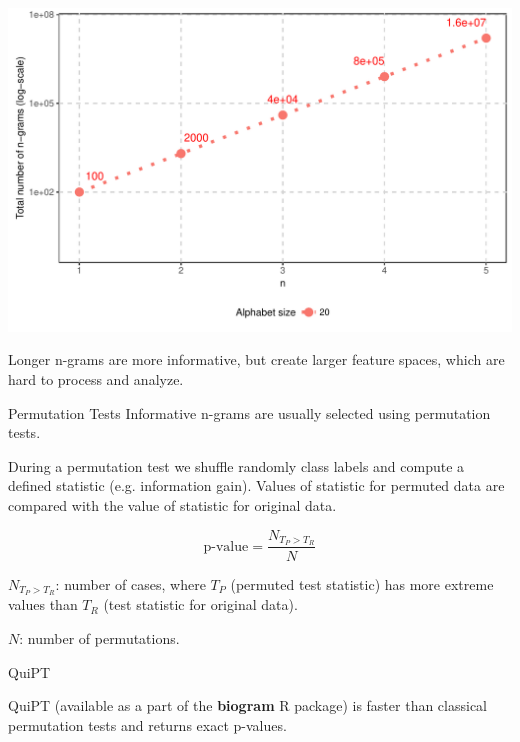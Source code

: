 \documentclass{beamer}\usepackage[]{graphicx}\usepackage[]{color}
\makeatletter
\def\maxwidth{ %
  \ifdim\Gin@nat@width>\linewidth
    \linewidth
  \else
    \Gin@nat@width
  \fi
}
\newenvironment{kframe}{%
 \def\at@end@of@kframe{}%
 \ifinner\ifhmode%
  \def\at@end@of@kframe{\end{minipage}}%
  \begin{minipage}{\columnwidth}%
 \fi\fi%
 \def\FrameCommand##1{\hskip\@totalleftmargin \hskip-\fboxsep
 \colorbox{shadecolor}{##1}\hskip-\fboxsep
     \hskip-\linewidth \hskip-\@totalleftmargin \hskip\columnwidth}%
 \MakeFramed {\advance\hsize-\width
   \@totalleftmargin\z@ \linewidth\hsize
   \@setminipage}}%
 {\par\unskip\endMakeFramed%
 \at@end@of@kframe}
\makeatother
\begin{document}
\begin{frame}

\includegraphics[width=\maxwidth]{figure/unnamed-chunk-5-1} 

Longer n-grams are more informative, but create larger feature spaces, which are hard to process and analyze.
\end{frame}

\begin{frame}{Permutation Tests}
  Informative n-grams are usually selected using permutation tests.

During a permutation test we shuffle randomly class labels and compute a defined statistic (e.g. information gain). Values of statistic for permuted data are compared with the value of statistic for original data.

$$
\textrm{p-value} = \frac{N_{T_P > T_R}}{N} $$

$N_{T_P > T_R}$: number of cases, where $T_P$ (permuted test statistic) has more extreme values than $T_R$ (test statistic for original data).

$N$: number of permutations.
  \end{frame}

\begin{frame}{QuiPT}  

\begin{kframe}


{\ttfamily\noindent\bfseries\color{errorcolor}{\#\# Error in readChar(con, 5L, useBytes = TRUE): cannot open the connection}}

{\ttfamily\noindent\bfseries{}}

{\ttfamily\noindent\bfseries\color{errorcolor}{\#\# Error in ggplot(times\_dat, aes(x = size, y = value, color = variable)): object 'times\_dat' not found}}\end{kframe}

QuiPT (available as a part of the \textbf{biogram} R package) is faster than classical permutation tests and returns exact p-values.
\end{frame}
\end{document}
